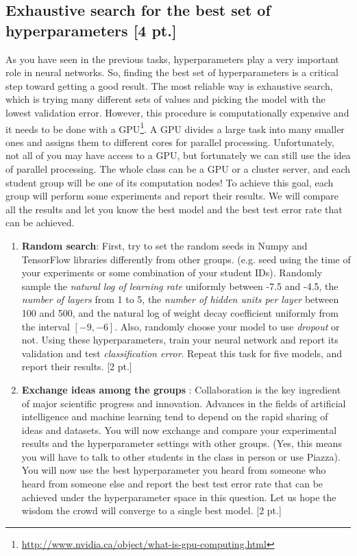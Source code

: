 \documentclass[12pt,letterpaper]{article}
\begin{document}
\subsection{Exhaustive search for the best set of hyperparameters  [4 pt.]}
As you have seen in the previous tasks, hyperparameters play a very important role in neural networks. So, finding the best set of hyperparameters is a critical step toward getting a good result. The most reliable way is exhaustive search, which is trying many different sets of values and picking the model with the lowest validation error. However, this procedure is computationally expensive and it needs to be done with a GPU\footnote{\url{http://www.nvidia.ca/object/what-is-gpu-computing.html}}. A GPU divides a large task into many smaller ones and assigns them to different cores for parallel processing. Unfortunately, not all of you may have access to a GPU, but fortunately we can still use the idea of parallel processing. The whole class can be a GPU or a cluster server, and each student group will be one of its computation nodes!
To achieve this goal, each group will perform some experiments and report their results.
We will compare all the results and let you know the best model and the best test error rate that can be achieved.
\begin{enumerate}
  \item \textbf{Random search}: First, try to set the random seeds in Numpy and TensorFlow libraries differently from other groups. (e.g. seed using the time of your experiments or some combination of your student IDs). Randomly sample the \textit{natural log of learning rate} uniformly between -7.5 and -4.5, the \textit{number of layers} from 1 to 5, the \textit{number of hidden units per layer} between 100 and 500, and the natural log of weight decay coefficient uniformly from the interval $[-9, -6]$. Also, randomly choose your model to use \textit{dropout} or not. Using these hyperparameters, train your neural network and report its validation and test \textit{classification error}. Repeat this task for five models, and report their results. [2 pt.] 
    
  \item \textbf{Exchange ideas among the groups }: Collaboration is the key ingredient of major scientific progress and innovation. Advances in the fields of artificial intelligence and machine learning tend to depend on the rapid sharing of ideas and datasets. You will now exchange and compare your experimental results and the hyperparameter settings with other groups. (Yes, this means you will have to talk to other students in the class in person or use Piazza). You will now use the best hyperparameter you heard from someone who heard from someone else and report the best test error rate that can be achieved under the hyperparameter space in this question. Let us hope the wisdom the crowd will converge to a single best model. [2 pt.]
\end{enumerate}
\end{document}
